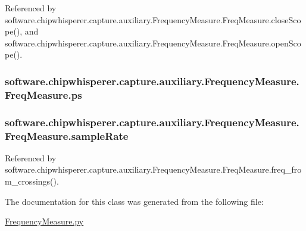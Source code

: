 Referenced by software.\+chipwhisperer.\+capture.\+auxiliary.\+Frequency\+Measure.\+Freq\+Measure.\+close\+Scope(), and software.\+chipwhisperer.\+capture.\+auxiliary.\+Frequency\+Measure.\+Freq\+Measure.\+open\+Scope().

\hypertarget{classsoftware_1_1chipwhisperer_1_1capture_1_1auxiliary_1_1FrequencyMeasure_1_1FreqMeasure_af2545458d3c342049086990489f391a5}{}
\subsubsection[{ps}]{\setlength{\rightskip}{0pt plus 5cm}software.\+chipwhisperer.\+capture.\+auxiliary.\+Frequency\+Measure.\+Freq\+Measure.\+ps}\label{classsoftware_1_1chipwhisperer_1_1capture_1_1auxiliary_1_1FrequencyMeasure_1_1FreqMeasure_af2545458d3c342049086990489f391a5}
\hypertarget{classsoftware_1_1chipwhisperer_1_1capture_1_1auxiliary_1_1FrequencyMeasure_1_1FreqMeasure_aa20585486d90250dd2d231f6e9c478ed}{}
\subsubsection[{sample\+Rate}]{\setlength{\rightskip}{0pt plus 5cm}software.\+chipwhisperer.\+capture.\+auxiliary.\+Frequency\+Measure.\+Freq\+Measure.\+sample\+Rate}\label{classsoftware_1_1chipwhisperer_1_1capture_1_1auxiliary_1_1FrequencyMeasure_1_1FreqMeasure_aa20585486d90250dd2d231f6e9c478ed}


Referenced by software.\+chipwhisperer.\+capture.\+auxiliary.\+Frequency\+Measure.\+Freq\+Measure.\+freq\+\_\+from\+\_\+crossings().



The documentation for this class was generated from the following file\+:\begin{DoxyCompactItemize}
\item 
\hyperlink{FrequencyMeasure_8py}{Frequency\+Measure.\+py}\end{DoxyCompactItemize}
